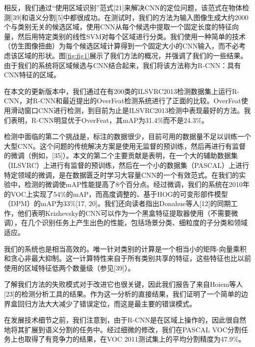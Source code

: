 \documentclass[../main.tex]{subfile}
\begin{document}
相反，我们通过“使用区域识别”范式[21]来解决CNN的定位问题，该范式在物体检测[39]和语义分割[5]中都很成功。在测试时，我们的方法为输入图像生成大约2000个与类别无关的候选区域，使用CNN从每个候选中提取一个固定长度的特征向量，然后用特定类别的线性SVM对每个区域进行分类。我们使用一种简单的技术（仿生图像扭曲）为每个候选区域计算得到一个固定大小的CNN输入，而不必考虑该区域的形状。图\ref{fig:fig1}展示了我们方法的概况，并强调了我们的一些结果。由于我们的系统将区域候选与CNN结合起来，我们将该方法称为R-CNN：具有CNN特征的区域。

在本文的更新版本中，我们通过在有200类的ILSVRC2013检测数据集上运行R-CNN，对R-CNN和最近提出的OverFeat\cite{overfeat}检测系统进行了正面的比较。OverFeat使用滑动窗口CNN进行检测，到目前为止是ILSVRC2013检测中表现最好的方法。我们表明，R-CNN明显优于OverFeat，其mAP为31.4\%而不是24.3\%。

检测中面临的第二个挑战是，标注的数据很少，目前可用的数据量不足以训练一个大型CNN。这个问题的传统解决方案是使用无监督的预训练，然后再进行有监督的微调（例如，[35]）。本文的第二个主要贡献是表明，在一个大的辅助数据集（ILSVRC）上进行有监督的预训练，然后在一个小的数据集（PASCAL）上进行特定领域的微调，是在数据匮乏时学习大容量CNN的一个有效范式。在我们的实验中，检测的微调使mAP性能提高了8个百分点。经过微调，我们的系统在2010年的VOC上实现了54\%的mAP，而高度调整的、基于HOG的可变形部件模型（DPM）的mAP为33\%[17, 20]。我们还向读者指出Donahue等人[12]的同期工作，他们表明Krizhevsky的CNN可以作为一个黑盒特征提取器使用（不需要微调），在几个识别任务上产生出色的性能，包括场景分类、细粒度的子分类和领域适应。

我们的系统也是相当高效的。唯一针对类别的计算是一个相当小的矩阵-向量乘积和贪心非最大抑制。这一计算特性来自于所有类别共享的特征，这些特征也比以前使用的区域特征低两个数量级（参见[39]）。

了解我们方法的失败模式对于改进它也很关键，因此我们报告了来自Hoiem等人[23]的检测分析工具的结果。作为这一分析的直接结果，我们证明了一个简单的边界盒回归方法大大减少了错误定位，而这是最主要的错误模式。

在发展技术细节之前，我们注意到，由于R-CNN是在区域上操作的，因此很自然地将其扩展到语义分割的任务中。经过细微的修改，我们在PASCAL VOC分割任务上也取得了有竞争力的结果，在VOC 2011测试集上的平均分割精度为47.9\%。
\end{document}
